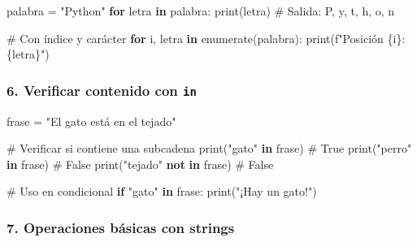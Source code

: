 \documentclass[
  doc,
  floatsintext,
  longtable,
  a4paper,
  nolmodern,
  notxfonts,
  notimes,
  12pt,
  colorlinks=true,linkcolor=blue,citecolor=blue,urlcolor=blue]{apa7}
\newenvironment{Shaded}{\begin{snugshade}}{\end{snugshade}}
\newcommand{\BuiltInTok}[1]{\textcolor[rgb]{0.00,0.23,0.31}{#1}}
\newcommand{\CommentTok}[1]{\textcolor[rgb]{0.37,0.37,0.37}{#1}}
\newcommand{\ControlFlowTok}[1]{\textcolor[rgb]{0.00,0.23,0.31}{\textbf{#1}}}
\newcommand{\KeywordTok}[1]{\textcolor[rgb]{0.00,0.23,0.31}{\textbf{#1}}}
\newcommand{\NormalTok}[1]{\textcolor[rgb]{0.00,0.23,0.31}{#1}}
\newcommand{\OperatorTok}[1]{\textcolor[rgb]{0.37,0.37,0.37}{#1}}
\newcommand{\SpecialCharTok}[1]{\textcolor[rgb]{0.37,0.37,0.37}{#1}}
\newcommand{\SpecialStringTok}[1]{\textcolor[rgb]{0.13,0.47,0.30}{#1}}
\newcommand{\StringTok}[1]{\textcolor[rgb]{0.13,0.47,0.30}{#1}}
\begin{document}
\begin{Shaded}
\begin{Highlighting}[]
\NormalTok{palabra }\OperatorTok{=} \StringTok{"Python"}
\ControlFlowTok{for}\NormalTok{ letra }\KeywordTok{in}\NormalTok{ palabra:}
    \BuiltInTok{print}\NormalTok{(letra)}
\CommentTok{\# Salida: P, y, t, h, o, n}

\CommentTok{\# Con índice y carácter}
\ControlFlowTok{for}\NormalTok{ i, letra }\KeywordTok{in} \BuiltInTok{enumerate}\NormalTok{(palabra):}
    \BuiltInTok{print}\NormalTok{(}\SpecialStringTok{f"Posición }\SpecialCharTok{\{}\NormalTok{i}\SpecialCharTok{\}}\SpecialStringTok{: }\SpecialCharTok{\{}\NormalTok{letra}\SpecialCharTok{\}}\SpecialStringTok{"}\NormalTok{)}
\end{Highlighting}
\end{Shaded}

\subsubsection{\texorpdfstring{6. Verificar contenido con
\texttt{in}}{6. Verificar contenido con in}}\label{verificar-contenido-con-in}

\begin{Shaded}
\begin{Highlighting}[]
\NormalTok{frase }\OperatorTok{=} \StringTok{"El gato está en el tejado"}

\CommentTok{\# Verificar si contiene una subcadena}
\BuiltInTok{print}\NormalTok{(}\StringTok{"gato"} \KeywordTok{in}\NormalTok{ frase)      }\CommentTok{\# True}
\BuiltInTok{print}\NormalTok{(}\StringTok{"perro"} \KeywordTok{in}\NormalTok{ frase)     }\CommentTok{\# False}
\BuiltInTok{print}\NormalTok{(}\StringTok{"tejado"} \KeywordTok{not} \KeywordTok{in}\NormalTok{ frase) }\CommentTok{\# False}

\CommentTok{\# Uso en condicional}
\ControlFlowTok{if} \StringTok{"gato"} \KeywordTok{in}\NormalTok{ frase:}
    \BuiltInTok{print}\NormalTok{(}\StringTok{"¡Hay un gato!"}\NormalTok{)}
\end{Highlighting}
\end{Shaded}

\subsubsection{7. Operaciones básicas con
strings}\label{operaciones-buxe1sicas-con-strings}
\end{document}
